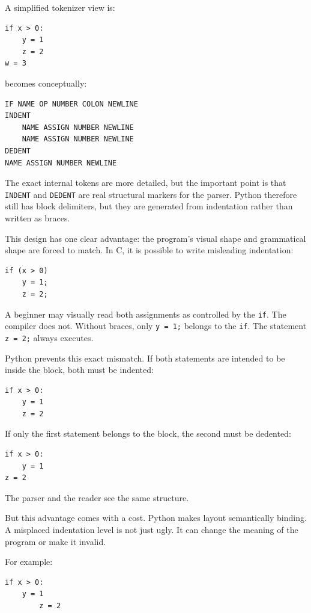 A simplified tokenizer view is:

\begin{verbatim}
if x > 0:
    y = 1
    z = 2
w = 3
\end{verbatim}

becomes conceptually:

\begin{verbatim}
IF NAME OP NUMBER COLON NEWLINE
INDENT
    NAME ASSIGN NUMBER NEWLINE
    NAME ASSIGN NUMBER NEWLINE
DEDENT
NAME ASSIGN NUMBER NEWLINE
\end{verbatim}

The exact internal tokens are more detailed, but the important point is that \texttt{INDENT} and \texttt{DEDENT} are real structural markers for the parser. Python therefore still has block delimiters, but they are generated from indentation rather than written as braces.

This design has one clear advantage: the program's visual shape and grammatical shape are forced to match. In C, it is possible to write misleading indentation:

\begin{verbatim}
if (x > 0)
    y = 1;
    z = 2;
\end{verbatim}

A beginner may visually read both assignments as controlled by the \texttt{if}. The compiler does not. Without braces, only \texttt{y = 1;} belongs to the \texttt{if}. The statement \texttt{z = 2;} always executes.

Python prevents this exact mismatch. If both statements are intended to be inside the block, both must be indented:

\begin{verbatim}
if x > 0:
    y = 1
    z = 2
\end{verbatim}

If only the first statement belongs to the block, the second must be dedented:

\begin{verbatim}
if x > 0:
    y = 1
z = 2
\end{verbatim}

The parser and the reader see the same structure.

But this advantage comes with a cost. Python makes layout semantically binding. A misplaced indentation level is not just ugly. It can change the meaning of the program or make it invalid.

For example:

\begin{verbatim}
if x > 0:
    y = 1
        z = 2
\end{verbatim}

